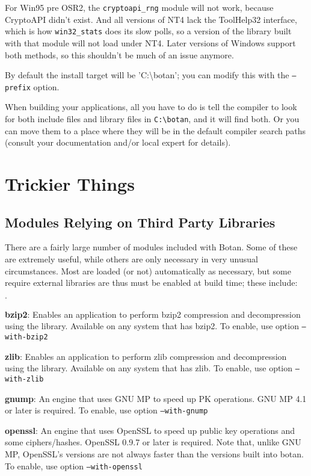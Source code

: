 \documentclass{article}
\begin{document}
For Win95 pre OSR2, the \verb|cryptoapi_rng| module will not work,
because CryptoAPI didn't exist. And all versions of NT4 lack the
ToolHelp32 interface, which is how \verb|win32_stats| does its slow
polls, so a version of the library built with that module will not
load under NT4. Later versions of Windows support both methods, so
this shouldn't be much of an issue anymore.

By default the install target will be 'C:\textbackslash botan'; you
can modify this with the \texttt{--prefix} option.

When building your applications, all you have to do is tell the
compiler to look for both include files and library files in
\verb|C:\botan|, and it will find both. Or you can move them to a
place where they will be in the default compiler search paths (consult
your documentation and/or local expert for details).

\section{Trickier Things}

\subsection{Modules Relying on Third Party Libraries}

There are a fairly large number of modules included with Botan. Some
of these are extremely useful, while others are only necessary in very
unusual circumstances. Most are loaded (or not) automatically as
necessary, but some require external libraries are thus must be
enabled at build time; these include:

\newcommand{\mod}[2]{\textbf{#1}: #2}

\begin{list}{$\cdot$}
  \item \mod{bzip2}{Enables an application to perform bzip2
    compression and decompression using the library. Available on any
    system that has bzip2. To enable, use option \texttt{--with-bzip2}}

  \item \mod{zlib}{Enables an application to perform zlib compression
    and decompression using the library. Available on any system that
    has zlib. To enable, use option \texttt{--with-zlib}}

  \item \mod{gnump}{An engine that uses GNU MP to speed up PK
    operations.  GNU MP 4.1 or later is required.  To enable, use
    option \texttt{--with-gnump}}

  \item \mod{openssl}{An engine that uses OpenSSL to speed up public
    key operations and some ciphers/hashes. OpenSSL 0.9.7 or later is
    required. Note that, unlike GNU MP, OpenSSL's versions are not
    always faster than the versions built into botan. To enable, use
    option \texttt{--with-openssl}}

\end{list}
\end{document}
